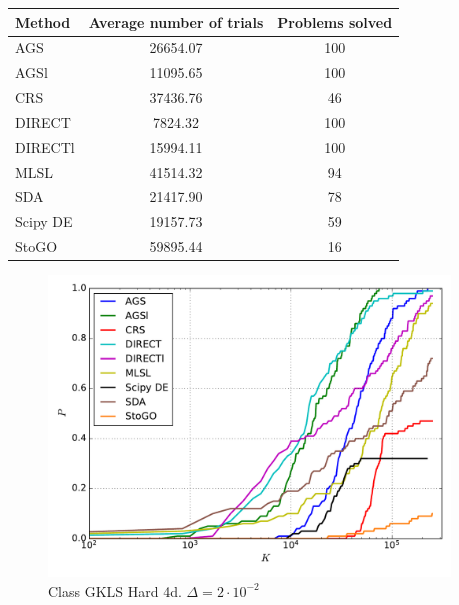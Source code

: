 \documentclass[a4paper]{article}
\begin{document}
\begin{tabular}{lcc}
\hline
 Method   &  Average number of trials  &  Problems solved  \\
\hline
 AGS      &          26654.07          &        100        \\
 AGSl     &          11095.65          &        100        \\
 CRS      &          37436.76          &        46         \\
 DIRECT   &          7824.32           &        100        \\
 DIRECTl  &          15994.11          &        100        \\
 MLSL     &          41514.32          &        94         \\
 SDA      &          21417.90          &        78         \\
 Scipy DE &          19157.73          &        59         \\
 StoGO    &          59895.44          &        16         \\
\hline
\end{tabular}
\begin{figure}[H]
  \center
  \includegraphics[width=0.95\textwidth]{../experiments/gklsh4d/cmc.pdf}
  \caption{Class GKLS Hard 4d. $\Delta=2\cdot10^{-2}$}
\end{figure}
\end{document}
